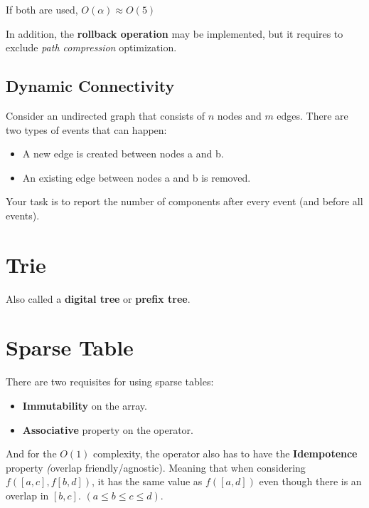     If both are used, $O(\alpha) \approx O(5)$

    In addition, the \textbf{rollback operation} may be implemented, but it requires to exclude \textit{path compression} optimization.



    \subsection{Dynamic Connectivity}

    Consider an undirected graph that consists of $n$ nodes and $m$ edges. There are two types of events that can happen:

    \begin{itemize}
    \item A new edge is created between nodes a and b.
    \item An existing edge between nodes a and b is removed.
    \end{itemize}
    
    Your task is to report the number of components after every event (and before all events).


\section{Trie}

    Also called a \textbf{digital tree} or \textbf{prefix tree}.
    

\section{Sparse Table}

    There are two requisites for using sparse tables:
    
    \begin{itemize}
        \item \textbf{Immutability} on the array.
        \item \textbf{Associative} property on the operator.
    \end{itemize}

    And for the $O(1)$ complexity, the operator also has to have the \textbf{Idempotence} property
    \textit(overlap friendly/agnostic). Meaning that when considering $f([a, c], f[b, d])$, it has the same value 
    as $f([a, d])$ even though there is an overlap in $[b, c]$. $(a \leq b \leq c \leq d)$.

